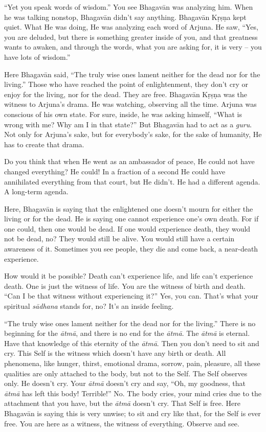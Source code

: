 “Yet you speak words of wisdom.” You see Bhagavān was analyzing him. When he was talking nonstop, Bhagavān didn’t say anything. Bhagavān Kṛṣṇa kept quiet. What He was doing, He was analyzing each word of Arjuna. He saw, “Yes, you are deluded, but there is something greater inside of you, and that greatness wants to awaken, and through the words, what you are asking for, it is very – you have lots of wisdom.”

Here Bhagavān said, “The truly wise ones lament neither for the dead nor for the living.” Those who have reached the point of enlightenment, they don’t cry or enjoy for the living, nor for the dead. They are free. Bhagavān Kṛṣṇa was the witness to Arjuna’s drama. He was watching, observing all the time. Arjuna was conscious of his own state. For sure, inside, he was asking himself, “What is wrong with me? Why am I in that state?” But Bhagavān had to act as a \textit{guru}. Not only for Arjuna’s sake, but for everybody’s sake, for the sake of humanity, He has to create that drama.

Do you think that when He went as an ambassador of peace, He could not have changed everything? He could! In a fraction of a second He could have annihilated everything from that court, but He didn’t. He had a different agenda. A long-term agenda.

Here, Bhagavān is saying that the enlightened one doesn’t mourn for either the living or for the dead. He is saying one cannot experience one’s own death. For if one could, then one would be dead. If one would experience death, they would not be dead, no? They would still be alive. You would still have a certain awareness of it. Sometimes you see people, they die and come back, a near-death experience.

How would it be possible? Death can’t experience life, and life can’t experience death. One is just the witness of life. You are the witness of birth and death. “Can I be that witness without experiencing it?” Yes, you can. That’s what your spiritual \textit{sādhana} stands for, no? It’s an inside feeling.

“The truly wise ones lament neither for the dead nor for the living.” There is no beginning for the \textit{ātmā}, and there is no end for the \textit{ātmā}. The \textit{ātmā} is eternal. Have that knowledge of this eternity of the \textit{ātmā}. Then you don’t need to sit and cry. This Self is the witness which doesn’t have any birth or death. All phenomena, like hunger, thirst, emotional drama, sorrow, pain, pleasure, all these qualities are only attached to the body, but not to the Self. The Self observes only. He doesn’t cry. Your \textit{ātmā} doesn’t cry and say, “Oh, my goodness, that \textit{ātmā} has left this body! Terrible!” No. The body cries, your mind cries due to the attachment that you have, but the \textit{ātmā} doesn’t cry. That Self is free. Here Bhagavān is saying this is very unwise; to sit and cry like that, for the Self is ever free. You are here as a witness, the witness of everything. Observe and see.

